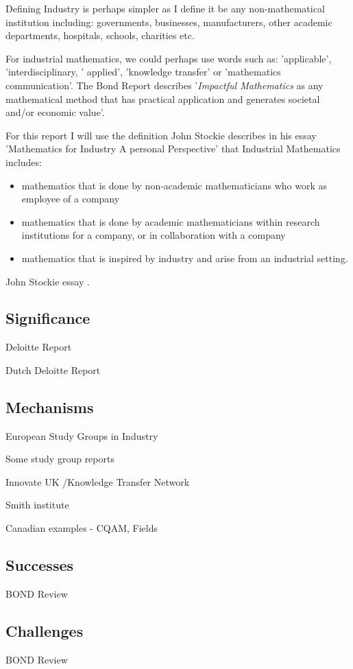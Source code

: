 \documentclass[11pt]{article} %
\begin{document}
	
 Defining Industry is perhaps simpler as I define it be any non-mathematical institution including: governments, businesses, manufacturers, other academic departments, hospitals, schools, charities etc. 


		For industrial mathematics, we could perhaps use words such as: 'applicable', 'interdisciplinary, ' applied', 'knowledge transfer' or 'mathematics communication'. The Bond Report \cite{Bond} describes '\textit{Impactful Mathematics} as any mathematical method that has practical application and generates societal and/or economic value'. 
		
		For this report I will use the definition John Stockie describes in his essay 'Mathematics for Industry A personal Perspective' \cite{Stockie2015} that Industrial Mathematics includes: 
		
	\begin{itemize}
	\item mathematics that is done by non-academic mathematicians who work as employee of a company
	\item mathematics that is done by academic mathematicians within research institutions for a company, or in collaboration with a company
	\item mathematics that is inspired by industry and arise from an industrial setting. 
	\end{itemize}
	
	
	John Stockie essay \cite{Stockie2015}.
	\subsection{Significance}
	Deloitte Report
	
	Dutch Deloitte Report 
	\subsection{Mechanisms}
	European Study Groups in Industry 
	
	Some study group reports 
	
	Innovate UK /Knowledge Transfer Network 
	
	Smith institute
	
	Canadian examples - CQAM, Fields 
	\subsection{Successes}
	BOND Review 
	\subsection{Challenges} 
	BOND Review
	
\end{document}
